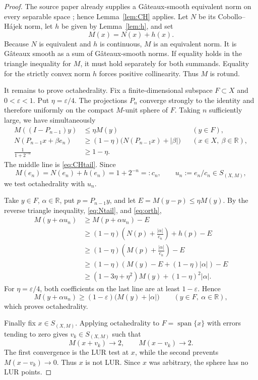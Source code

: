 \documentclass[11pt]{article}
\newcommand{\R}{\mathbb R}
\newcommand{\eps}{\varepsilon}
\begin{document}
\begin{proof}
The source paper already supplies a G\^ateaux-smooth equivalent norm on every
separable space \cite[Theorem~3.3]{DPS}; hence Lemma~\ref{lem:CH} applies.
Let $N$ be its Cobollo--H\'ajek norm, let $h$ be given by
Lemma~\ref{lem:h}, and set
\[
                              M(x)=N(x)+h(x).
\]
Because $N$ is equivalent and $h$ is continuous, $M$ is an equivalent norm.
It is G\^ateaux smooth as a sum of G\^ateaux-smooth norms.  If equality holds
in the triangle inequality for $M$, it must hold separately for both
summands.  Equality for the strictly convex norm $h$ forces positive
collinearity.  Thus $M$ is rotund.

It remains to prove octahedrality.  Fix a finite-dimensional subspace
$F\subset X$ and $0<\eps<1$.  Put $\eta=\eps/4$.  The projections $P_n$
converge strongly to the identity and therefore uniformly on the compact
$M$-unit sphere of $F$.  Taking $n$ sufficiently large, we have simultaneously
\begin{align}
 M((I-P_{n-1})y)&\le\eta M(y) &&(y\in F),\label{eq:tailF}\\
 N(P_{n-1}x+\beta e_n)&\ge(1-\eta)
       \bigl(N(P_{n-1}x)+|\beta|\bigr) &&(x\in X,\ \beta\in\R),\label{eq:Ntail}\\
 \frac1{1+2^{-n}}&\ge1-\eta.\label{eq:cn}
\end{align}
The middle line is \eqref{eq:CHtail}.  Since
\[
 M(e_n)=N(e_n)+h(e_n)=1+2^{-n}=:c_n,
 \qquad u_n:=e_n/c_n\in S_{(X,M)},
\]
we test octahedrality with $u_n$.

Take $y\in F$, $\alpha\in\R$, put $p=P_{n-1}y$, and let
$E=M(y-p)\le\eta M(y)$.  By the reverse triangle inequality,
\eqref{eq:Ntail}, and \eqref{eq:orth},
\begin{align*}
 M(y+\alpha u_n)
 &\ge M(p+\alpha u_n)-E\\
 &\ge (1-\eta)\left(N(p)+\frac{|\alpha|}{c_n}\right)+h(p)-E\\
 &\ge (1-\eta)\left(M(p)+\frac{|\alpha|}{c_n}\right)-E\\
 &\ge (1-\eta)\left(M(y)-E+(1-\eta)|\alpha|\right)-E\\
 &\ge (1-3\eta+\eta^2)M(y)+(1-\eta)^2|\alpha|.
\end{align*}
For $\eta=\eps/4$, both coefficients on the last line are at least
$1-\eps$.  Hence
\[
 M(y+\alpha u_n)\ge(1-\eps)\bigl(M(y)+|\alpha|\bigr)
 \qquad(y\in F,\ \alpha\in\R),
\]
which proves octahedrality.

Finally fix $x\in S_{(X,M)}$.  Applying octahedrality to
$F=\operatorname{span}\{x\}$ with errors tending to zero gives
$v_k\in S_{(X,M)}$ such that
\[
 M(x+v_k)\longrightarrow2,
 \qquad M(x-v_k)\longrightarrow2.
\]
The first convergence is the LUR test at $x$, while the second prevents
$M(x-v_k)\to0$.  Thus $x$ is not LUR.  Since $x$ was arbitrary, the sphere has
no LUR points.
\end{proof}
\end{document}
